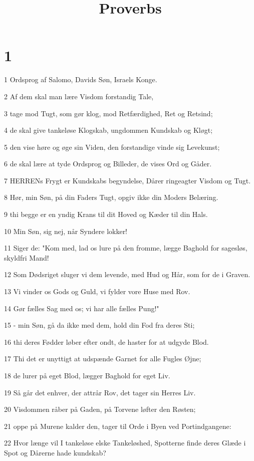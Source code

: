 

\title{Proverbs}


\chapter{1}

\par 1 Ordsprog af Salomo, Davids Søn, Israels Konge.
\par 2 Af dem skal man lære Visdom forstandig Tale,
\par 3 tage mod Tugt, som gør klog, mod Retfærdighed, Ret og Retsind;
\par 4 de skal give tankeløse Klogskab, ungdommen Kundskab og Kløgt;
\par 5 den vise høre og øge sin Viden, den forstandige vinde sig Levekunst;
\par 6 de skal lære at tyde Ordsprog og Billeder, de vises Ord og Gåder.
\par 7 HERRENs Frygt er Kundskabs begyndelse, Dårer ringeagter Visdom og Tugt.
\par 8 Hør, min Søn, på din Faders Tugt, opgiv ikke din Moders Belæring.
\par 9 thi begge er en yndig Krans til dit Hoved og Kæder til din Hals.
\par 10 Min Søn, sig nej, når Syndere lokker!
\par 11 Siger de: "Kom med, lad os lure på den fromme, lægge Baghold for sagesløs, skyldfri Mand!
\par 12 Som Dødsriget sluger vi dem levende, med Hud og Hår, som for de i Graven.
\par 13 Vi vinder os Gods og Guld, vi fylder vore Huse med Rov.
\par 14 Gør fælles Sag med os; vi har alle fælles Pung!"
\par 15 - min Søn, gå da ikke med dem, hold din Fod fra deres Sti;
\par 16 thi deres Fødder løber efter ondt, de haster for at udgyde Blod.
\par 17 Thi det er unyttigt at udspænde Garnet for alle Fugles Øjne;
\par 18 de lurer på eget Blod, lægger Baghold for eget Liv.
\par 19 Så går det enhver, der attrår Rov, det tager sin Herres Liv.
\par 20 Visdommen råber på Gaden, på Torvene løfter den Røsten;
\par 21 oppe på Murene kalder den, tager til Orde i Byen ved Portindgangene:
\par 22 Hvor længe vil I tankeløse elske Tankeløshed, Spotterne finde deres Glæde i Spot og Dårerne hade kundskab?
